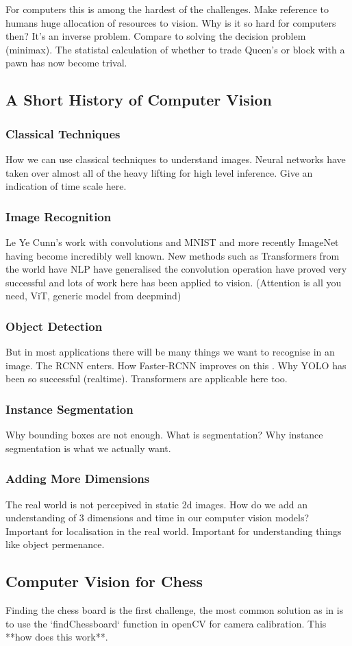 For computers this is among the hardest of the challenges.  
Make reference to humans huge allocation of resources to vision. \cite{}
Why is it so hard for computers then? It's an inverse problem. 
Compare to solving the decision problem (minimax).  
The statistal calculation of whether to trade Queen's or block with a pawn has now become trival.  

\subsection{A Short History of Computer Vision}
\subsubsection{Classical Techniques}
How we can use classical techniques to understand images.  Neural networks have taken over almost all of the heavy lifting for high level inference.
Give an indication of time scale here.
\subsubsection{Image Recognition}
Le Ye Cunn's work with convolutions \cite{} and MNIST \cite{} and more recently ImageNet \cite{} having become incredibly well known.
New methods such as Transformers from the world have NLP have generalised the convolution operation have proved 
very successful and lots of work here has been applied to vision. \cite{} \cite{} \cite{} (Attention is all you need, ViT, generic model from deepmind)
\subsubsection{Object Detection}
But in most applications there will be many things we want to recognise in an image.  The RCNN \cite{} enters.  How Faster-RCNN improves on this \cite{}.
Why YOLO \cite{} has been so successful (realtime).  Transformers are applicable here too.
\subsubsection{Instance Segmentation}
Why bounding boxes are not enough.  What is segmentation? Why instance segmentation is what we actually want. \cite{}
\subsubsection{Adding More Dimensions}
The real world is not percepived in static 2d images.  How do we add an understanding of 3 dimensions and time in our computer vision models? \cite{}
Important for localisation in the real world.  Important for understanding things like object permenance.


\subsection{Computer Vision for Chess}
Finding the chess board is the first challenge, the most common solution as in \cite{} 
is to use the `findChessboard` function in openCV for camera calibration.  This **how does 
this work**.  